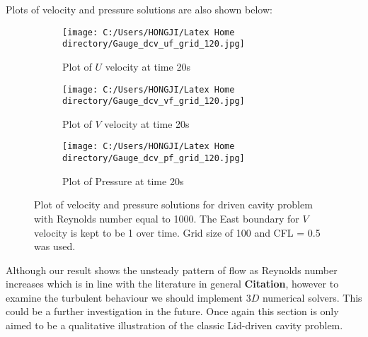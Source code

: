 Plots of velocity and pressure solutions are also shown below:
\begin{figure}[H]
	\centering
	\begin{subfigure}[t]{2.5in}
		\centering
		\texttt{[image: C:/Users/HONGJI/Latex Home directory/Gauge\_dcv\_uf\_grid\_120.jpg]}
		\caption{Plot of $U$ velocity at time 20s}\label{fig:6.19a}		
	\end{subfigure}
	\quad
	\begin{subfigure}[t]{2.5in}
		\centering
		\texttt{[image: C:/Users/HONGJI/Latex Home directory/Gauge\_dcv\_vf\_grid\_120.jpg]}
		\caption{Plot of $V$ velocity at time 20s}\label{fig:6.19b}
	\end{subfigure}
	\quad
	\centering
	\begin{subfigure}[t]{3.5in}
		\centering
		\texttt{[image: C:/Users/HONGJI/Latex Home directory/Gauge\_dcv\_pf\_grid\_120.jpg]}
		\caption{Plot of Pressure at time 20s}\label{fig:6.19a}		
	\end{subfigure}
	\caption{Plot of velocity and pressure solutions for driven cavity problem with Reynolds number equal to 1000. The East boundary for $V$ velocity is kept to be 1 over time. Grid size of 100 and CFL = 0.5 was used.}\label{fig:6.16}
\end{figure}

Although our result shows the unsteady pattern of flow as Reynolds number increases which is in line with the literature in general \textbf{Citation}, however to examine the turbulent behaviour we should implement $3D$ numerical solvers. This could be a further investigation in the future. Once again this section is only aimed to be a qualitative illustration of the classic Lid-driven cavity problem. 
